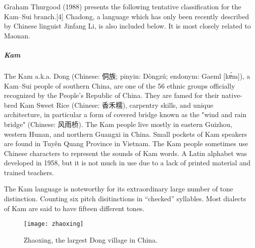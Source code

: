 Graham Thurgood (1988) presents the following tentative classification for the Kam–Sui branch.[4] Chadong, a language which has only been recently described by Chinese linguist Jinfang Li, is also included below. It is most closely related to Maonan.



\subparagraph{Kam} The Kam a.k.a. Dong (Chinese: 侗族; pinyin: Dòngzú; endonym: Gaeml [kɐ́m]), a Kam–Sui people of southern China, are one of the 56 ethnic groups officially recognized by the People's Republic of China. They are famed for their native-bred Kam Sweet Rice (Chinese: 香禾糯), carpentry skills, and unique architecture, in particular a form of covered bridge known as the "wind and rain bridge" (Chinese: 风雨桥). The Kam people live mostly in eastern Guizhou, western Hunan, and northern Guangxi in China. Small pockets of Kam speakers are found in Tuyên Quang Province in Vietnam. The Kam people sometimes use Chinese characters to represent the sounds of Kam words. A Latin alphabet was developed in 1958, but it is not much in use due to a lack of printed material and trained teachers. 

The Kam language is noteworthy for its extraordinary large number of tone distinction. Counting six pitch disitinctions in ``checked'' syllables. Most dialects of Kam are said to have fifteen different tones.

\begin{figure}[htbp]
\parindent=0pt
\centering

\texttt{[image: zhaoxing]}
\caption{Zhaoxing, the largest Dong village in China.}
\end{figure}